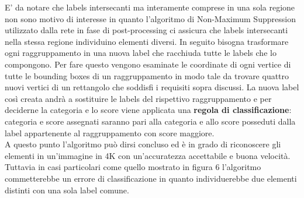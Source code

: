 E' da notare che labels intersecanti ma interamente comprese in una sola regione non sono motivo di interesse in quanto l'algoritmo di Non-Maximum Suppression utilizzato dalla rete in fase di post-processing ci assicura che labels intersecanti nella stessa regione individuino elementi diversi.
In seguito bisogna trasformare ogni raggruppamento in una nuova label che racchiuda tutte le labels che lo compongono. Per fare questo vengono esaminate le coordinate di ogni vertice di tutte le bounding boxes di un raggruppamento in modo tale da trovare quattro nuovi vertici di un rettangolo che soddisfi i requisiti sopra discussi. La nuova label così creata andrà a sostituire le labels del rispettivo raggruppamento e per deciderne la categoria e lo score viene applicata una \textbf{regola di classificazione}: categoria e score assegnati saranno pari alla categoria e allo score posseduti dalla label appartenente al raggruppamento con score maggiore.\\
A questo punto l'algoritmo può dirsi concluso ed è in grado di riconoscere gli elementi in un'immagine in 4K con un'accuratezza accettabile e buona velocità. Tuttavia in casi particolari come quello mostrato in figura 6 l'algoritmo commetterebbe un errore di classificazione in quanto individuerebbe due elementi distinti con una sola label comune.
